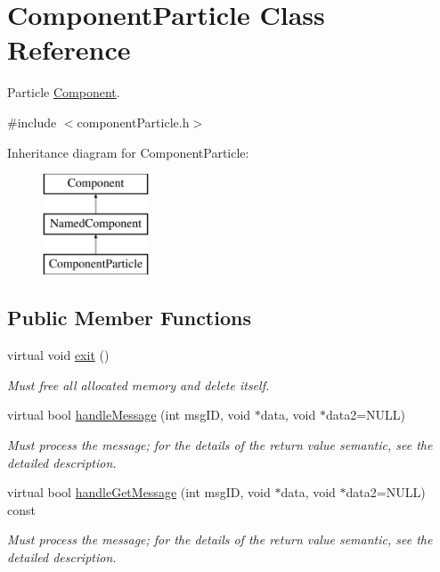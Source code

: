 \hypertarget{classComponentParticle}{
\section{\-Component\-Particle \-Class \-Reference}
\label{d5/d47/classComponentParticle}
}


\-Particle \hyperlink{classComponent}{\-Component}.  




{\ttfamily \#include $<$component\-Particle.\-h$>$}

\-Inheritance diagram for \-Component\-Particle\-:\begin{figure}[H]
\begin{center}
\leavevmode
\includegraphics[height=3.000000cm]{d5/d47/classComponentParticle}
\end{center}
\end{figure}
\subsection*{\-Public \-Member \-Functions}
\begin{DoxyCompactItemize}
\item 
\hypertarget{classComponentParticle_aff7392837b24dbd61be9c163bc01f8d0}{
virtual void \hyperlink{classComponentParticle_aff7392837b24dbd61be9c163bc01f8d0}{exit} ()}
\label{d5/d47/classComponentParticle_aff7392837b24dbd61be9c163bc01f8d0}

\begin{DoxyCompactList}\small\item\em \-Must free all allocated memory and delete itself. \end{DoxyCompactList}\item 
virtual bool \hyperlink{classComponentParticle_a370ce255d55dcc0363ec67fa4038ddaf}{handle\-Message} (int msg\-I\-D, void $\ast$data, void $\ast$data2=\-N\-U\-L\-L)
\begin{DoxyCompactList}\small\item\em \-Must process the message; for the details of the return value semantic, see the detailed description. \end{DoxyCompactList}\item 
virtual bool \hyperlink{classComponentParticle_a1fd33aca0505c4602b9e5c6bbbfcf94b}{handle\-Get\-Message} (int msg\-I\-D, void $\ast$data, void $\ast$data2=\-N\-U\-L\-L) const 
\begin{DoxyCompactList}\small\item\em \-Must process the message; for the details of the return value semantic, see the detailed description. \end{DoxyCompactList}\end{DoxyCompactItemize}
